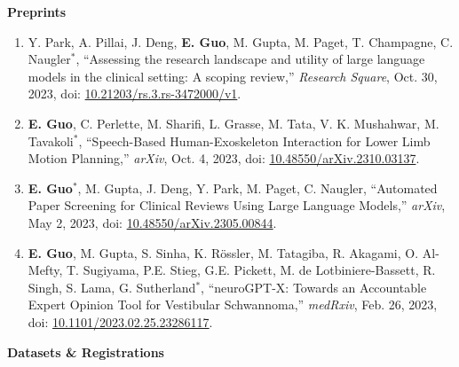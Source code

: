 \documentclass{article}
\begin{document}
\textbf{Preprints} \vspace{.5em}

\begin{enumerate}
    \item Y. Park, A. Pillai, J. Deng, \textbf{E. Guo}, M. Gupta, M. Paget, T. Champagne, C. Naugler$^*$, ``Assessing the research landscape and utility of large language models in the clinical setting: A scoping review,'' \textit{Research Square}, Oct. 30, 2023, doi: \href{https://doi.org/10.21203/rs.3.rs-3472000/v1}{10.21203/rs.3.rs-3472000/v1}.
    \item \textbf{E. Guo}, C. Perlette, M. Sharifi, L. Grasse, M. Tata, V. K. Mushahwar, M. Tavakoli$^*$, ``Speech-Based Human-Exoskeleton Interaction for Lower Limb Motion Planning,'' \textit{arXiv}, Oct. 4, 2023, doi: \href{https://doi.org/10.48550/arXiv.2310.03137}{10.48550/arXiv.2310.03137}.
    \item \textbf{E. Guo}$^*$, M. Gupta, J. Deng, Y. Park, M. Paget, C. Naugler, ``Automated Paper Screening for Clinical Reviews Using Large Language Models,'' \textit{arXiv}, May 2, 2023, doi: \href{https://doi.org/10.48550/arXiv.2305.00844}{10.48550/arXiv.2305.00844}.
    \item \textbf{E. Guo}, M. Gupta, S. Sinha, K. R\"ossler, M. Tatagiba, R. Akagami, O. Al-Mefty, T. Sugiyama, P.E. Stieg, G.E. Pickett, M. de Lotbiniere-Bassett, R. Singh, S. Lama, G. Sutherland$^*$, ``neuroGPT-X: Towards an Accountable Expert Opinion Tool for Vestibular Schwannoma,'' \textit{medRxiv}, Feb. 26, 2023, doi: \href{https://doi.org/10.1101/2023.02.25.23286117}{10.1101/2023.02.25.23286117}.
\end{enumerate} \vspace{1em}

\textbf{Datasets \& Registrations} \vspace{.5em}
\end{document}
